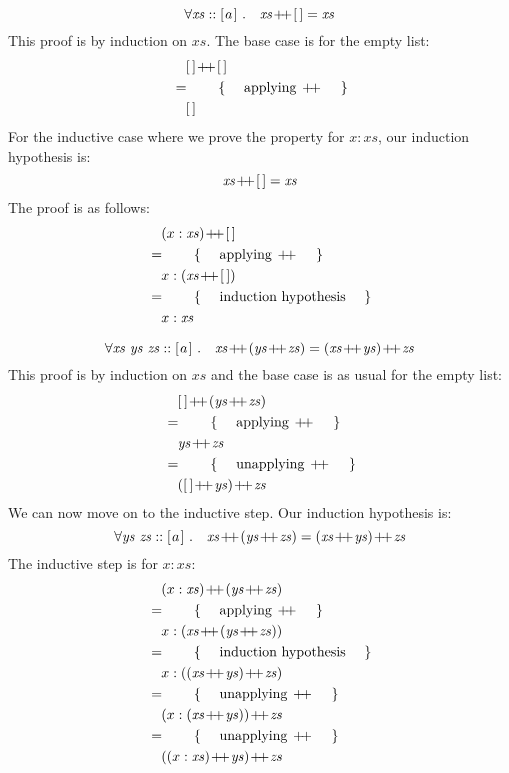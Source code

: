 \begin{displaymath}
\forall \mathit{xs} :: \hslist{a}~. \quad \mathit{xs} \append \hslist{} = \mathit{xs}
\end{displaymath}
This proof is by induction on $\mathit{xs}$. The base case is for the empty list:
\begin{align*}
\expr{\hslist{} \append \hslist{}}
\hint{applying $\append$}
\lastexpr{\hslist{}}
\end{align*}
For the inductive case where we prove the property for $x:\mathit{xs}$, our induction hypothesis is:
\begin{displaymath}
\mathit{xs} \append \hslist{} = \mathit{xs}
\end{displaymath}
The proof is as follows:
\begin{align*}
\expr{(x:\mathit{xs}) \append \hslist{}}
\hint{applying $\append$}
\expr{x : (\mathit{xs} \append \hslist{})}
\hint{induction hypothesis}
\expr{x : \mathit{xs}}
\end{align*}

\begin{displaymath}
\forall \mathit{xs}~\mathit{ys}~\mathit{zs} :: \hslist{a}~. \quad \mathit{xs} \append (\mathit{ys} \append \mathit{zs}) = (\mathit{xs} \append \mathit{ys}) \append \mathit{zs}
\end{displaymath}
This proof is by induction on $\mathit{xs}$ and the base case is as usual for the empty list:
\begin{align*}
\expr{\hslist{} \append (\mathit{ys} \append \mathit{zs})}
\hint{applying $\append$}
\expr{\mathit{ys} \append \mathit{zs}}
\hint{unapplying $\append$}
\lastexpr{(\hslist{} \append \mathit{ys}) \append \mathit{zs}}
\end{align*}
We can now move on to the inductive step. Our induction hypothesis is:
\begin{displaymath}
\forall \mathit{ys}~\mathit{zs} :: \hslist{a}~. \quad \mathit{xs} \append (\mathit{ys} \append \mathit{zs}) = (\mathit{xs} \append \mathit{ys}) \append \mathit{zs}
\end{displaymath}
The inductive step is for $x:\mathit{xs}$:
\begin{align*}
\expr{(x:\mathit{xs}) \append (\mathit{ys} \append \mathit{zs})}
\hint{applying $\append$}
\expr{x: (\mathit{xs} \append (\mathit{ys} \append \mathit{zs}))}
\hint{induction hypothesis}
\expr{x : ((\mathit{xs} \append \mathit{ys}) \append \mathit{zs})}
\hint{unapplying $\append$}
\expr{(x : (\mathit{xs} \append \mathit{ys})) \append \mathit{zs}}
\hint{unapplying $\append$}
\lastexpr{((x:\mathit{xs}) \append \mathit{ys}) \append \mathit{zs}}
\end{align*}

